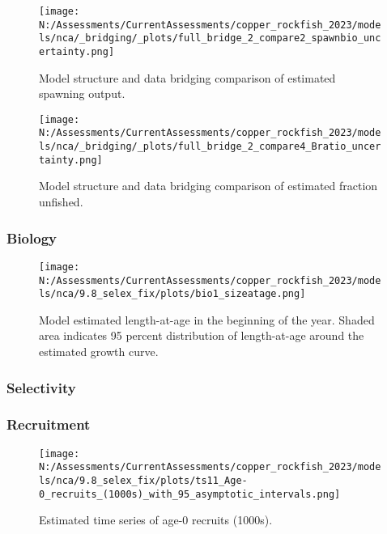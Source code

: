 \documentclass[11pt,
  english,
  letterpaper,
]{article}
\begin{document}
\begin{figure}
\centering
\texttt{[image: N:/Assessments/CurrentAssessments/copper\_rockfish\_2023/models/nca/\_bridging/\_plots/full\_bridge\_2\_compare2\_spawnbio\_uncertainty.png]}
\caption{Model structure and data bridging comparison of estimated spawning output.\label{fig:data-bridge-ssb-2}}
\end{figure}

\pagebreak

\begin{figure}
\centering
\texttt{[image: N:/Assessments/CurrentAssessments/copper\_rockfish\_2023/models/nca/\_bridging/\_plots/full\_bridge\_2\_compare4\_Bratio\_uncertainty.png]}
\caption{Model structure and data bridging comparison of estimated fraction unfished.\label{fig:data-bridge-depl-2}}
\end{figure}

\pagebreak

\pagebreak

\hypertarget{biology-1}{%
\subsubsection{Biology}\label{biology-1}}

\begin{figure}
\centering
\texttt{[image: N:/Assessments/CurrentAssessments/copper\_rockfish\_2023/models/nca/9.8\_selex\_fix/plots/bio1\_sizeatage.png]}
\caption{Model estimated length-at-age in the beginning of the year. Shaded area indicates 95 percent distribution of length-at-age around the estimated growth curve.\label{fig:mod-est-len-age}}
\end{figure}

\pagebreak

\hypertarget{selectivity}{%
\subsubsection{Selectivity}\label{selectivity}}

\pagebreak

\hypertarget{recruitment-1}{%
\subsubsection{Recruitment}\label{recruitment-1}}

\begin{figure}
\centering
\texttt{[image: N:/Assessments/CurrentAssessments/copper\_rockfish\_2023/models/nca/9.8\_selex\_fix/plots/ts11\_Age-0\_recruits\_(1000s)\_with\_95\_asymptotic\_intervals.png]}
\caption{Estimated time series of age-0 recruits (1000s).\label{fig:recruits}}
\end{figure}
\end{document}
